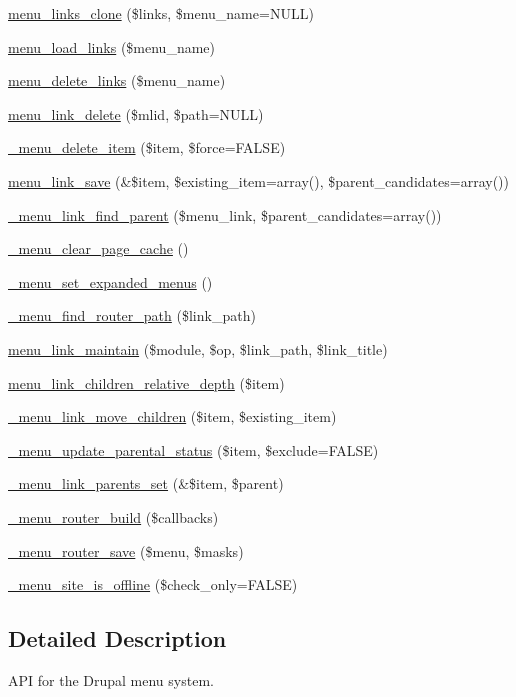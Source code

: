 \begin{DoxyCompactItemize}
\item 
\hyperlink{group__menu_ga327aef442c1c6c4b2a7d14742f37af2a}{menu\_\-links\_\-clone} (\$links, \$menu\_\-name=NULL)
\item 
\hyperlink{group__menu_gac82038848d5c321b972769ff821d4aa1}{menu\_\-load\_\-links} (\$menu\_\-name)
\item 
\hyperlink{group__menu_gade553e3a51918b9290425df7f775aa14}{menu\_\-delete\_\-links} (\$menu\_\-name)
\item 
\hyperlink{group__menu_gacb2dddc8ca84476f38a90f4487156b12}{menu\_\-link\_\-delete} (\$mlid, \$path=NULL)
\item 
\hyperlink{group__menu_gaf60be5755b46e635c04963e61cdc809a}{\_\-menu\_\-delete\_\-item} (\$item, \$force=FALSE)
\item 
\hyperlink{group__menu_ga133b177fee00b678a19afba18fb81ebc}{menu\_\-link\_\-save} (\&\$item, \$existing\_\-item=array(), \$parent\_\-candidates=array())
\item 
\hyperlink{group__menu_ga4a310e057a335748d2d3c4bd9cb02a15}{\_\-menu\_\-link\_\-find\_\-parent} (\$menu\_\-link, \$parent\_\-candidates=array())
\item 
\hyperlink{group__menu_ga6b3bf9ba8f43f983382911beb62ffba0}{\_\-menu\_\-clear\_\-page\_\-cache} ()
\item 
\hyperlink{group__menu_ga08212e3890c64045fcf6b44032b343a0}{\_\-menu\_\-set\_\-expanded\_\-menus} ()
\item 
\hyperlink{group__menu_ga0842f6b9cf84f5e5ff159159063a78dd}{\_\-menu\_\-find\_\-router\_\-path} (\$link\_\-path)
\item 
\hyperlink{group__menu_gae3248649fb437dedad940df74fb129dc}{menu\_\-link\_\-maintain} (\$module, \$op, \$link\_\-path, \$link\_\-title)
\item 
\hyperlink{group__menu_ga75c0660b49841423d8d3c8908e9023fc}{menu\_\-link\_\-children\_\-relative\_\-depth} (\$item)
\item 
\hyperlink{group__menu_gaeb7542558d6fab7c79b96c1188ee6d67}{\_\-menu\_\-link\_\-move\_\-children} (\$item, \$existing\_\-item)
\item 
\hyperlink{group__menu_ga9df6c2183ab9ee0e934eec54a67761d8}{\_\-menu\_\-update\_\-parental\_\-status} (\$item, \$exclude=FALSE)
\item 
\hyperlink{group__menu_ga67ab71fff6e17ce3c32752c3bfa00d96}{\_\-menu\_\-link\_\-parents\_\-set} (\&\$item, \$parent)
\item 
\hyperlink{group__menu_ga662b13ca71a8b780c9a3b372b25492c3}{\_\-menu\_\-router\_\-build} (\$callbacks)
\item 
\hyperlink{group__menu_gaa7e7e12f5c89718ac147c0e166458135}{\_\-menu\_\-router\_\-save} (\$menu, \$masks)
\item 
\hyperlink{group__menu_ga1bfe1a44b1867b0c02a241b6cc43e50c}{\_\-menu\_\-site\_\-is\_\-offline} (\$check\_\-only=FALSE)
\end{DoxyCompactItemize}


\subsection{Detailed Description}
API for the Drupal menu system. 